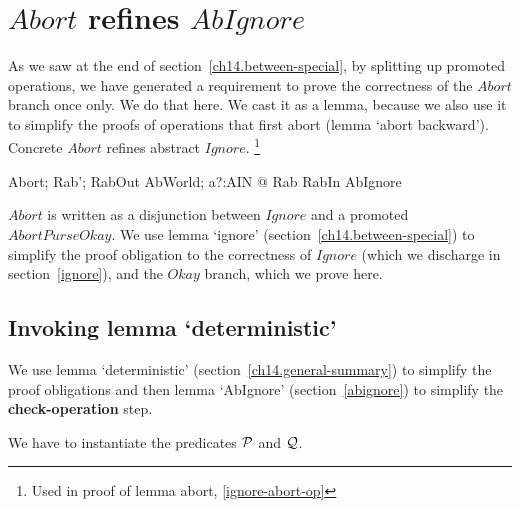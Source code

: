 \section{$Abort$ refines $AbIgnore$}
\label{proof-gen-abort-lemma}
As we saw at the end of section~\ref{ch14.between-special}, by
splitting up promoted operations, we have generated a requirement to
prove the correctness of the $Abort$ branch once only.  We do that
here.  We cast it as a lemma, because we also use it to simplify the
proofs of operations that first abort (lemma `abort backward').
  {\rm Concrete $Abort$ refines abstract $Ignore$.}%
  \footnote{Used in proof of lemma abort, \ref{ignore-abort-op}}
  \begin{gzed}
    Abort; Rab'; RabOut
    \shows \exists AbWorld; a?:AIN @ Rab \land RabIn \land AbIgnore
  \end{gzed}


$Abort$ is written as a disjunction between $Ignore$ and a promoted
$AbortPurseOkay$.  We use lemma `ignore'
(section~\ref{ch14.between-special}) to simplify the proof
obligation to the correctness of $Ignore$ (which we discharge in
section~\ref{ignore}), and the $Okay$ branch, which we prove here.
\subsection{Invoking lemma `deterministic'}
We use lemma `deterministic' (section~\ref{ch14.general-summary}) to
simplify the proof obligations and then lemma `AbIgnore'
(section~\ref{abignore}) to simplify the {\bf check-operation} step.

We have to instantiate the predicates $\mathcal{P}$ and
$\mathcal{Q}$.

